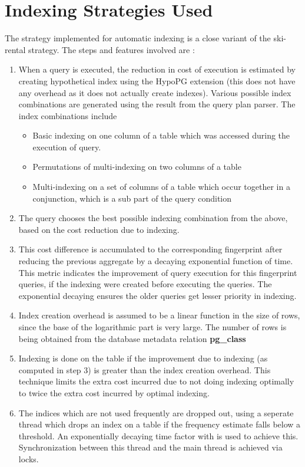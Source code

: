 \documentclass[runningheads]{llncs}
\begin{document}
\section{Indexing Strategies Used}
The strategy implemented for automatic indexing is a close variant of the ski-rental strategy. The steps and features involved are :

\begin{enumerate}
    \item When a query is executed, the reduction in cost of execution is estimated by creating hypothetical index using the HypoPG extension (this does not have any overhead as it does not actually create indexes). Various possible index combinations are generated using the result from the query plan parser. The index combinations include
    \begin{itemize}
        \item Basic indexing on one column of a table which was accessed during the execution of query.
        \item Permutations of multi-indexing on two columns of a table
        \item Multi-indexing on a set of columns of a table which occur together in a conjunction, which is a sub part of the query condition
    \end{itemize}
    \item The query chooses the best possible indexing combination from the above,  based on the cost reduction due to indexing.
    \item This cost difference is accumulated to the corresponding fingerprint after reducing the previous aggregate by a decaying exponential function of time. This metric indicates the improvement of query execution for this fingerprint queries, if the indexing were created before executing the queries. The exponential decaying ensures the older queries get lesser priority in indexing. 
    \item Index creation overhead is assumed to be a linear function in the size of rows, since the base of the logarithmic part is very large. The number of rows is being obtained from the database metadata relation \textbf{pg\_class}
    \item Indexing is done on the table if the improvement due to indexing (as computed in step 3) is greater than the index creation overhead. This technique limits the extra cost incurred due to not doing indexing optimally to twice the extra cost incurred by optimal indexing.
    \item The indices which are not used frequently are dropped out, using a seperate thread which drops an index on a table if the frequency estimate falls below a threshold. An exponentially decaying time factor with is used to achieve this. Synchronization between this thread and the main thread is achieved via locks.

\end{enumerate}
\end{document}
